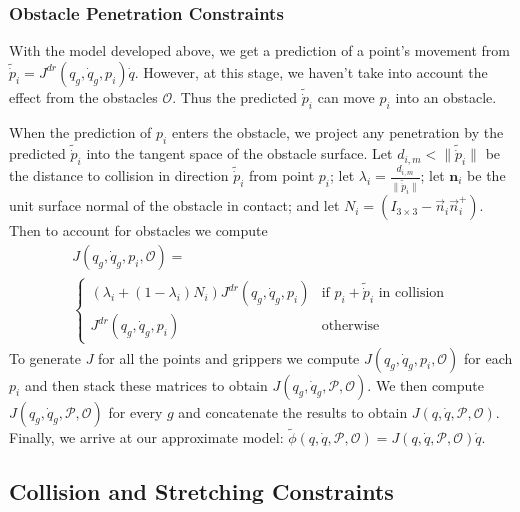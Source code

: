 \subsubsection{Obstacle Penetration Constraints}
With the model developed above, we get a prediction of a point's movement from $\tilde{\dot{p}}_i = J^{dr}(q_g, \dot{q}_g, p_i)\dot{q}$. 
However, at this stage, we haven't take into account the effect from the obstacles $\mathcal{O}$. Thus the predicted $\tilde{\dot{p}}_i$ can move $p_i$ into an obstacle.

When the prediction of $p_i$ enters the obstacle, we project any penetration by the predicted $\tilde{\dot{p}}_i$ into the tangent space of the obstacle surface. Let $d_{i,m} < \| \tilde{\dot{p}}_i \|$ be the distance to collision in direction $\tilde{\dot{p}}_i$ from point $p
_i$; let $\lambda_i = \frac{d_{i,m}}{\| \tilde{\dot{p}}_i \|}$; let $\textbf{n}_i$ be the unit surface normal of the obstacle in contact; and let $N_i = (I_{3\times 3}-\vec{n}_i \vec{n}_i^+)$. Then to account for obstacles we compute
\begin{equation}
\begin{split}
  J(q_g, \dot{q}_g, p_i, \mathcal{O}) =\hspace{6cm}\\
  \begin{cases}
    (\lambda_i + (1 - \lambda_i)N_i)J^{dr}(q_g, \dot{q}_g, p_i) & \text{if $p_i+\tilde{\dot{p}}_i$ in collision} \\
    J^{dr}(q_g, \dot{q}_g, p_i) & \text{otherwise}
  \end{cases}
\end{split}
\end{equation}
To generate $J$ for all the points and grippers we compute $J(q_g, \dot{q}_g, p_i,\mathcal{O})$ for each $p_i$ and then stack these matrices to obtain $J(q_g, \dot{q}_g, \mathcal{P},\mathcal{O})$. We then compute $J(q_g, \dot{q}_g, \mathcal{P},\mathcal{O})$ for every $g$ and concatenate the results to obtain $J(q, \dot{q}, \mathcal{P},\mathcal{O})$. Finally, we arrive at our approximate model: $\tilde{\phi}(q,\dot{q},\mathcal{P},\mathcal{O}) = J(q, \dot{q},\mathcal{P},\mathcal{O})\dot{q}$.


\subsection{Collision and Stretching Constraints}\label{Method_Constraint Preserving Controller}

